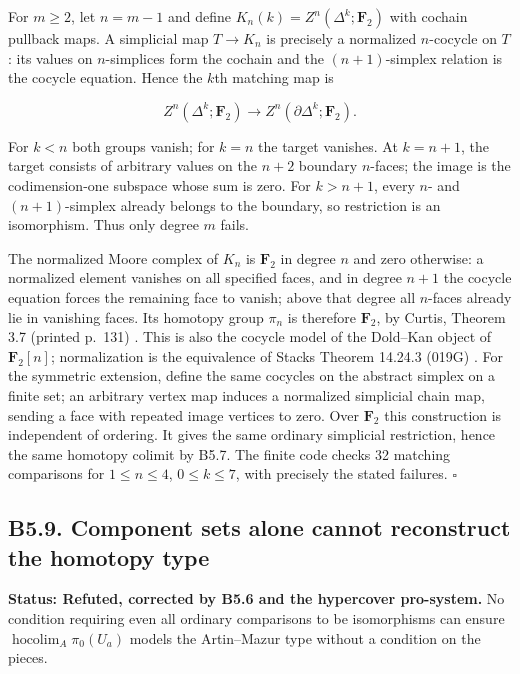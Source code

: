 For \(m\ge2\), let \(n=m-1\) and define
\(K_n(k)=Z^n(\Delta^k;\mathbf F_2)\) with cochain pullback maps. A
simplicial map \(T\to K_n\) is precisely a normalized \(n\)-cocycle on
\(T\): its values on \(n\)-simplices form the cochain and the
\((n+1)\)-simplex relation is the cocycle equation. Hence the \(k\)th
matching map is

\[Z^n(\Delta^k;\mathbf F_2)\to Z^n(\partial\Delta^k;\mathbf F_2).\]

For \(k<n\) both groups vanish; for \(k=n\) the target vanishes. At
\(k=n+1\), the target consists of arbitrary values on the \(n+2\)
boundary \(n\)-faces; the image is the codimension-one subspace whose
sum is zero. For \(k>n+1\), every \(n\)- and \((n+1)\)-simplex already
belongs to the boundary, so restriction is an isomorphism. Thus only
degree \(m\) fails.

The normalized Moore complex of \(K_n\) is \(\mathbf F_2\) in degree
\(n\) and zero otherwise: a normalized element vanishes on all specified
faces, and in degree \(n+1\) the cocycle equation forces the remaining
face to vanish; above that degree all \(n\)-faces already lie in
vanishing faces. Its homotopy group \(\pi_n\) is therefore
\(\mathbf F_2\), by Curtis, Theorem 3.7 (printed p.~131)
\cite{B56Curtis1971}. This is also the cocycle model of the Dold--Kan
object of \(\mathbf F_2[n]\); normalization is the equivalence of Stacks
Theorem 14.24.3 (019G) \cite{B56StacksDK}. For the symmetric extension,
define the same cocycles on the abstract simplex on a finite set; an
arbitrary vertex map induces a normalized simplicial chain map, sending
a face with repeated image vertices to zero. Over \(\mathbf F_2\) this
construction is independent of ordering. It gives the same ordinary
simplicial restriction, hence the same homotopy colimit by B5.7. The
finite code checks 32 matching comparisons for \(1\le n\le4\),
\(0\le k\le7\), with precisely the stated failures. \(\square\)

\subsection{B5.9. Component sets alone cannot reconstruct the
homotopy
type}\label{b5.9.-component-sets-alone-cannot-reconstruct-the-homotopy-type}

\textbf{Status: Refuted, corrected by B5.6 and the hypercover
pro-system.} No condition requiring even all ordinary comparisons to be
isomorphisms can ensure \(\operatorname{hocolim}_A\pi_0(U_a)\) models
the Artin--Mazur type without a condition on the pieces.

